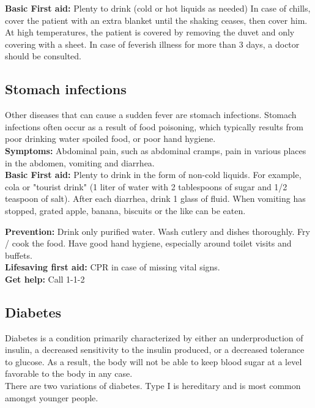 \documentclass[../../../main.tex]{subfiles}
\begin{document}
\begin{multicols}{2}
\textbf{Basic First aid:} Plenty to drink (cold or hot liquids as needed) In case of chills, cover the patient with an extra blanket until the shaking ceases, then cover him. At high temperatures, the patient is covered by removing the duvet and only covering with a sheet. In case of feverish illness for more than 3 days, a doctor should be consulted.
\\

\subsection*{Stomach infections} Other diseases that can cause a sudden fever are stomach infections. Stomach infections often occur as a result of food poisoning, which typically results from poor drinking water spoiled food, or poor hand hygiene.
\\

\textbf{Symptoms:} Abdominal pain, such as abdominal cramps, pain in various places in the abdomen, vomiting and diarrhea.
\\

\textbf{Basic First aid:} Plenty to drink in the form of non-cold liquids. For example, cola or "tourist drink" (1 liter of water with 2 tablespoons of sugar and 1/2 teaspoon of salt). After each diarrhea, drink 1 glass of fluid. When vomiting has stopped, grated apple, banana, biscuits or the like can be eaten.

\textbf{Prevention:} Drink only purified water. Wash cutlery and dishes thoroughly. Fry / cook the food. Have good hand hygiene, especially around toilet visits and buffets.
\\

\textbf{Lifesaving first aid:} CPR in case of missing vital signs.
\\

\textbf{Get help:} Call 1-1-2
\\

\subsection*{Diabetes} Diabetes is a condition primarily characterized by either an underproduction of insulin, a decreased sensitivity to the insulin produced, or a decreased tolerance to glucose. As a result, the body will not be able to keep blood sugar at a level favorable to the body in any case.
\\

\textbf{}There are two variations of diabetes. Type I is hereditary and is most common amongst younger people. 
\\


\end{multicols}
\end{document}
